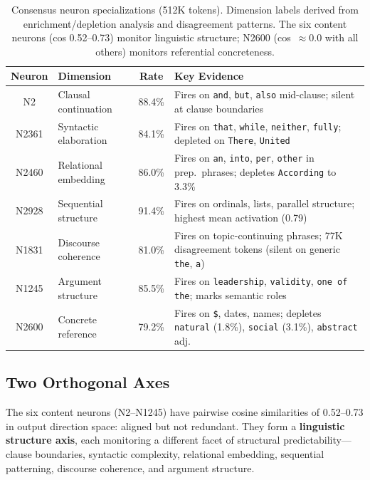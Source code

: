 \documentclass{article}
\begin{document}
\begin{table}[t]
\centering
\caption{Consensus neuron specializations (512K tokens). Dimension labels
derived from enrichment/depletion analysis and disagreement patterns.
The six content neurons (cos 0.52--0.73) monitor linguistic structure;
N2600 (cos~$\approx 0.0$ with all others) monitors referential concreteness.}
\label{tab:consensus}
\begin{tabular}{@{}clcp{4.5cm}@{}}
\toprule
Neuron & Dimension & Rate & Key Evidence \\
\midrule
N2     & Clausal continuation   & 88.4\% & Fires on \texttt{and}, \texttt{but}, \texttt{also} mid-clause; silent at clause boundaries \\
N2361  & Syntactic elaboration  & 84.1\% & Fires on \texttt{that}, \texttt{while}, \texttt{neither}, \texttt{fully}; depleted on \texttt{There}, \texttt{United} \\
N2460  & Relational embedding   & 86.0\% & Fires on \texttt{an}, \texttt{into}, \texttt{per}, \texttt{other} in prep.\ phrases; depletes \texttt{According} to 3.3\% \\
N2928  & Sequential structure   & 91.4\% & Fires on ordinals, lists, parallel structure; highest mean activation (0.79) \\
N1831  & Discourse coherence    & 81.0\% & Fires on topic-continuing phrases; 77K disagreement tokens (silent on generic \texttt{the}, \texttt{a}) \\
N1245  & Argument structure     & 85.5\% & Fires on \texttt{leadership}, \texttt{validity}, \texttt{one of the}; marks semantic roles \\
\midrule
N2600  & Concrete reference     & 79.2\% & Fires on \texttt{\$}, dates, names; depletes \texttt{natural} (1.8\%), \texttt{social} (3.1\%), \texttt{abstract} adj. \\
\bottomrule
\end{tabular}
\end{table}

\subsection{Two Orthogonal Axes}

The six content neurons (N2--N1245) have pairwise cosine similarities of
0.52--0.73 in output direction space: aligned but not redundant.
They form a \textbf{linguistic structure axis}, each monitoring a different
facet of structural predictability---clause boundaries, syntactic complexity,
relational embedding, sequential patterning, discourse coherence, and argument
structure.
\end{document}
